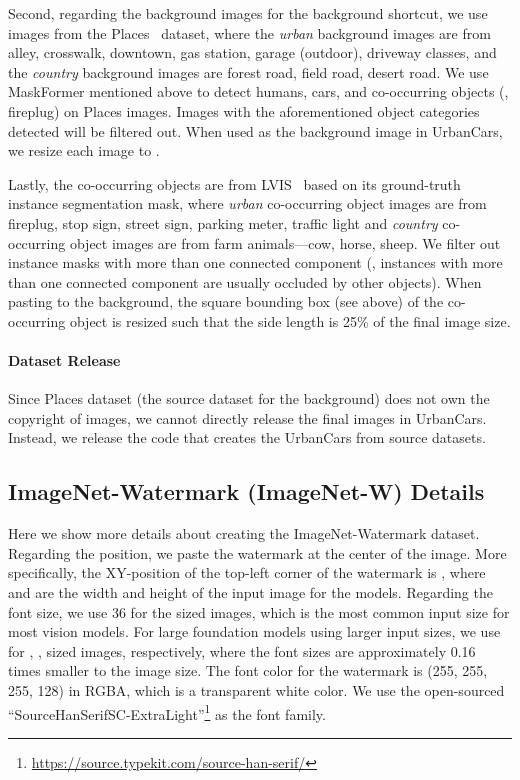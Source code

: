 \documentclass[10pt,twocolumn,letterpaper]{article}
\begin{document}
Second, regarding the background images for the background shortcut, we use images from the Places~\cite{zhou2018IEEETrans.PatternAnal.Mach.Intell.Places} dataset, where the \textit{urban} background images are from alley, crosswalk, downtown, gas station, garage (outdoor), driveway classes, and the \textit{country} background images are forest road, field road, desert road. We use MaskFormer mentioned above to detect humans, cars, and co-occurring objects (\eg, fireplug) on Places images. Images with the aforementioned object categories detected will be filtered out. When used as the background image in UrbanCars, we resize each image to .

Lastly, the co-occurring objects are from LVIS~\cite{gupta2019IEEECVFConf.Comput.Vis.PatternRecognit.CVPRLVIS} based on its ground-truth instance segmentation mask, where \textit{urban} co-occurring object images are from fireplug, stop sign, street sign, parking meter, traffic light and \textit{country} co-occurring object images are from farm animals---cow, horse, sheep. We filter out instance masks with more than one connected component (\eg, instances with more than one connected component are usually occluded by other objects). When pasting to the background, the square bounding box (see above) of the co-occurring object is resized such that the side length is 25\% of the final image size.


\paragraph{Dataset Release} Since Places dataset (the source dataset for the background) does not own the copyright of images, we cannot directly release the final images in UrbanCars. Instead, we release the code that creates the UrbanCars from source datasets.

\subsection{ImageNet-Watermark (ImageNet-W) Details}
\label{appx:subsec:in_w_details}

Here we show more details about creating the ImageNet-Watermark dataset. Regarding the position, we paste the watermark at the center of the image. More specifically, the XY-position of the top-left corner of the watermark is , where  and  are the width and height of the input image for the models. Regarding the font size, we use 36 for the  sized images, which is the most common input size for most vision models. For large foundation models using larger input sizes, we use   for , ,  sized images, respectively, where the font sizes are approximately 0.16 times smaller to the image size. The font color for the watermark is (255, 255, 255, 128) in RGBA, which is a transparent white color. We use the open-sourced ``SourceHanSerifSC-ExtraLight''\footnote{\url{https://source.typekit.com/source-han-serif/}} as the font family.
\end{document}
